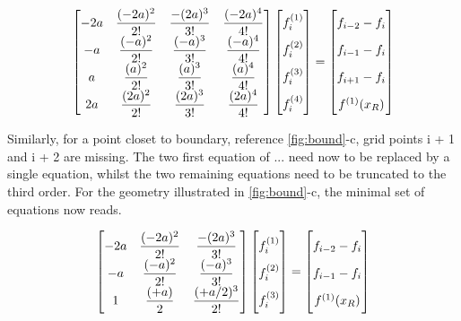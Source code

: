 \begin{align}
\begin{bmatrix} \label{eq:matrix4}
    -2a & \dfrac{(-2a)^2}{2!} & \dfrac{-(2a)^3}{3!} & \dfrac{(-2a)^4}{4!}\\
    -a & \dfrac{(-a)^2}{2!} & \dfrac{(-a)^3}{3!} & \dfrac{(-a)^4}{4!}\\
    a & \dfrac{(a)^2}{2!} & \dfrac{(a)^3}{3!} & \dfrac{(a)^4}{4!}\\
    2a & \dfrac{(2a)^2}{2!} & \dfrac{(2a)^3}{3!} & \dfrac{(2a)^4}{4!}
\end{bmatrix}
\begin{bmatrix}
    f_i^{(1)}  \vphantom{ \dfrac{d^4}{d} }\\
    f_i^{(2)}  \vphantom{ \dfrac{d^4}{d} } \\
    f_i^{(3)}  \vphantom{ \dfrac{d^4}{d} } \\
    f_i^{(4)}  \vphantom{ \dfrac{d^4}{d} }
\end{bmatrix}
=
\begin{bmatrix}
    f_{i-2} - f_{i}    \vphantom{ \dfrac{d^4}{d}} \\
    f_{i-1} - f_{i}    \vphantom{ \dfrac{d^4}{d}} \\
    f_{i+1} - f_{i}    \vphantom{ \dfrac{d^4}{d}} \\
    f^{(1)}(x_R)   \vphantom{ \dfrac{d^4}{d}}
\end{bmatrix}
\end{align}

Similarly, for a point closet to boundary, reference \ref{fig:bound}-c, grid points i + 1 and i + 2 are missing. The two first equation of ... need now to be replaced by a single equation, whilst the two remaining equations need to be truncated to the third order. For the geometry illustrated in \ref{fig:bound}-c, the minimal set of equations now reads.

\begin{align} \label{eq:matrix3}
\begin{bmatrix}
    -2a & \dfrac{(-2a)^2}{2!} & \dfrac{-(2a)^3}{3!}\\
    -a & \dfrac{(-a)^2}{2!} & \dfrac{(-a)^3}{3!}\\
    1 & \dfrac{(+a)}{2} & \dfrac{(+a/2)^3}{2!}
\end{bmatrix}
\begin{bmatrix}
    f_i^{(1)}  \vphantom{ \dfrac{d^4}{d} }\\
    f_i^{(2)}  \vphantom{ \dfrac{d^4}{d} } \\
    f_i^{(3)}  \vphantom{ \dfrac{d^4}{d} }
\end{bmatrix}
=
\begin{bmatrix}
    f_{i-2} - f_{i}    \vphantom{ \dfrac{d^4}{d}} \\
    f_{i-1} - f_{i}    \vphantom{ \dfrac{d^4}{d}} \\
    f^{(1)}(x_R)   \vphantom{ \dfrac{d^4}{d}}
\end{bmatrix}
\end{align}

